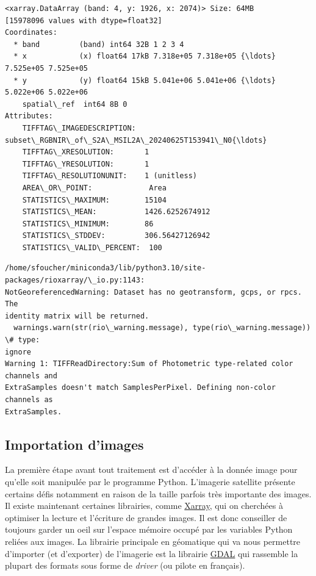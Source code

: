 \documentclass[11pt]{article}
\begin{document}
    \begin{Verbatim}[commandchars=\\\{\}]
<xarray.DataArray (band: 4, y: 1926, x: 2074)> Size: 64MB
[15978096 values with dtype=float32]
Coordinates:
  * band         (band) int64 32B 1 2 3 4
  * x            (x) float64 17kB 7.318e+05 7.318e+05 {\ldots} 7.525e+05 7.525e+05
  * y            (y) float64 15kB 5.041e+06 5.041e+06 {\ldots} 5.022e+06 5.022e+06
    spatial\_ref  int64 8B 0
Attributes:
    TIFFTAG\_IMAGEDESCRIPTION:  subset\_RGBNIR\_of\_S2A\_MSIL2A\_20240625T153941\_N0{\ldots}
    TIFFTAG\_XRESOLUTION:       1
    TIFFTAG\_YRESOLUTION:       1
    TIFFTAG\_RESOLUTIONUNIT:    1 (unitless)
    AREA\_OR\_POINT:             Area
    STATISTICS\_MAXIMUM:        15104
    STATISTICS\_MEAN:           1426.6252674912
    STATISTICS\_MINIMUM:        86
    STATISTICS\_STDDEV:         306.56427126942
    STATISTICS\_VALID\_PERCENT:  100
    \end{Verbatim}

    \begin{Verbatim}[commandchars=\\\{\}]
/home/sfoucher/miniconda3/lib/python3.10/site-packages/rioxarray/\_io.py:1143:
NotGeoreferencedWarning: Dataset has no geotransform, gcps, or rpcs. The
identity matrix will be returned.
  warnings.warn(str(rio\_warning.message), type(rio\_warning.message))  \# type:
ignore
Warning 1: TIFFReadDirectory:Sum of Photometric type-related color channels and
ExtraSamples doesn't match SamplesPerPixel. Defining non-color channels as
ExtraSamples.
    \end{Verbatim}

    \hypertarget{importation-dimages}{%
\subsection{Importation d'images}\label{importation-dimages}}

La première étape avant tout traitement est d'accéder à la donnée image
pour qu'elle soit manipulée par le programme Python. L'imagerie
satellite présente certains défis notamment en raison de la taille
parfois très importante des images. Il existe maintenant certaines
librairies, comme \href{https://docs.xarray.dev/en/stable/}{Xarray}, qui
on cherchées à optimiser la lecture et l'écriture de grandes images. Il
est donc conseiller de toujours garder un oeil sur l'espace mémoire
occupé par les variables Python reliées aux images. La librairie
principale en géomatique qui va nous permettre d'importer (et
d'exporter) de l'imagerie est la librairie \href{https://gdal.org}{GDAL}
qui rassemble la plupart des formats sous forme de \emph{driver} (ou
pilote en français).
\end{document}
